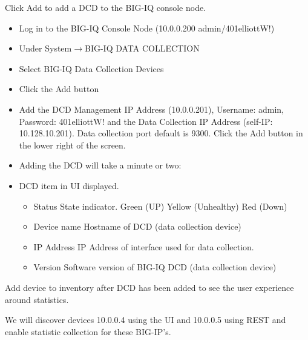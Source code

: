 \documentclass[letterpaper,10pt,english]{sphinxmanual}
\begin{document}
Click Add to add a DCD to the BIG-IQ console node.
\begin{itemize}
\item {} 
Log in to the BIG-IQ Console Node (10.0.0.200 admin/401elliottW!)

\item {} 
Under System\(\rightarrow\)BIG-IQ DATA COLLECTION

\item {} 
Select BIG-IQ Data Collection Devices

\item {} 
Click the Add button


\item {} 
Add the DCD Management IP Address (10.0.0.201), Username: admin,
Password: 401elliottW! and the Data Collection IP Address (self-IP:
10.128.10.201). Data collection port default is 9300. Click the Add
button in the lower right of the screen.


\item {} 
Adding the DCD will take a minute or two:


\item {} 
DCD item in UI displayed.
\begin{itemize}
\item {} 
Status \textendash{} State indicator. Green (UP) \textbar{} Yellow (Unhealthy) \textbar{} Red
(Down)

\item {} 
Device name \textendash{} Hostname of DCD (data collection device)

\item {} 
IP Address \textendash{} IP Address of interface used for data collection.

\item {} 
Version \textendash{} Software version of BIG-IQ DCD (data collection device)

\end{itemize}

\end{itemize}

Add device to inventory after DCD has been added to see the user experience around statistics.

We will discover devices 10.0.0.4 using the UI and 10.0.0.5 using REST
and enable statistic collection for these BIG-IP’s.
\end{document}
